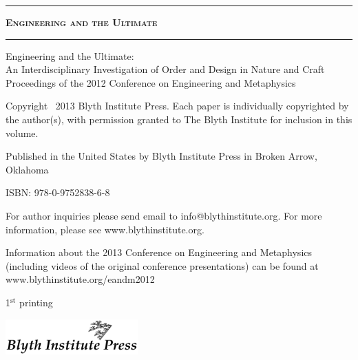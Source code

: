 \begin{titlepage}
\begingroup

\setlength{\parindent}{0cm}
\setlength{\parskip}{1em}

\vspace*{\fill}
\begin{center}
\hrule
{\LARGE \textsc{\textbf{Engineering and the Ultimate}}}
\baselineskip
\hrule
\end{center}
\vspace*{\fill}

\clearpage %

\thispagestyle{empty}
\vspace*{\fill}

{\small
Engineering and the Ultimate: \\ An Interdisciplinary Investigation of Order and Design in Nature and Craft \\ Proceedings of the 2012 Conference on Engineering and Metaphysics

Copyright \textcopyright\ 2013 Blyth Institute Press.  Each paper is individually copyrighted by the author(s), with permission granted to The Blyth Institute for inclusion in this volume.

Published in the United States by Blyth Institute Press in Broken Arrow, Oklahoma


ISBN: 978-0-9752838-6-8

For author inquiries please send email to info@blythinstitute.org.  For more information, please see www.blythinstitute.org.

Information about the 2013 Conference on Engineering and Metaphysics (including videos of the original conference presentations) can be found at www.blythinstitute.org/eandm2012

\baselineskip

1$^{\textrm{st}}$ printing}

\baselineskip

\includegraphics[width=2in]{bipresslogo.png}


\vspace*{\fill}

\clearpage %


\end{titlepage}
